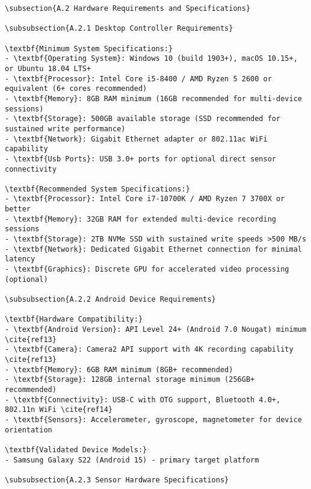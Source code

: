 \begin{verbatim}
\subsection{A.2 Hardware Requirements and Specifications}

\subsubsection{A.2.1 Desktop Controller Requirements}

\textbf{Minimum System Specifications:}
- \textbf{Operating System}: Windows 10 (build 1903+), macOS 10.15+, or Ubuntu 18.04 LTS+
- \textbf{Processor}: Intel Core i5-8400 / AMD Ryzen 5 2600 or equivalent (6+ cores recommended)
- \textbf{Memory}: 8GB RAM minimum (16GB recommended for multi-device sessions)
- \textbf{Storage}: 500GB available storage (SSD recommended for sustained write performance)
- \textbf{Network}: Gigabit Ethernet adapter or 802.11ac WiFi capability
- \textbf{Usb Ports}: USB 3.0+ ports for optional direct sensor connectivity

\textbf{Recommended System Specifications:}
- \textbf{Processor}: Intel Core i7-10700K / AMD Ryzen 7 3700X or better
- \textbf{Memory}: 32GB RAM for extended multi-device recording sessions
- \textbf{Storage}: 2TB NVMe SSD with sustained write speeds >500 MB/s
- \textbf{Network}: Dedicated Gigabit Ethernet connection for minimal latency
- \textbf{Graphics}: Discrete GPU for accelerated video processing (optional)

\subsubsection{A.2.2 Android Device Requirements}

\textbf{Hardware Compatibility:}
- \textbf{Android Version}: API Level 24+ (Android 7.0 Nougat) minimum \cite{ref13}
- \textbf{Camera}: Camera2 API support with 4K recording capability \cite{ref13}
- \textbf{Memory}: 6GB RAM minimum (8GB+ recommended)
- \textbf{Storage}: 128GB internal storage minimum (256GB+ recommended)
- \textbf{Connectivity}: USB-C with OTG support, Bluetooth 4.0+, 802.11n WiFi \cite{ref14}
- \textbf{Sensors}: Accelerometer, gyroscope, magnetometer for device orientation

\textbf{Validated Device Models:}
- Samsung Galaxy S22 (Android 15) - primary target platform

\subsubsection{A.2.3 Sensor Hardware Specifications}


\end{verbatim}
